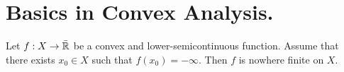 \chapter{Basics in Convex Analysis.}

\begin{proposition}
Let $f: X \rightarrow \bar{\mathbb{R}}$ be a convex and lower-semicontinuous function.
Assume that there exists $x_0 \in X$ such that $f(x_0) = -\infty$. Then $f$ is nowhere finite on $X$.
\end{proposition} 